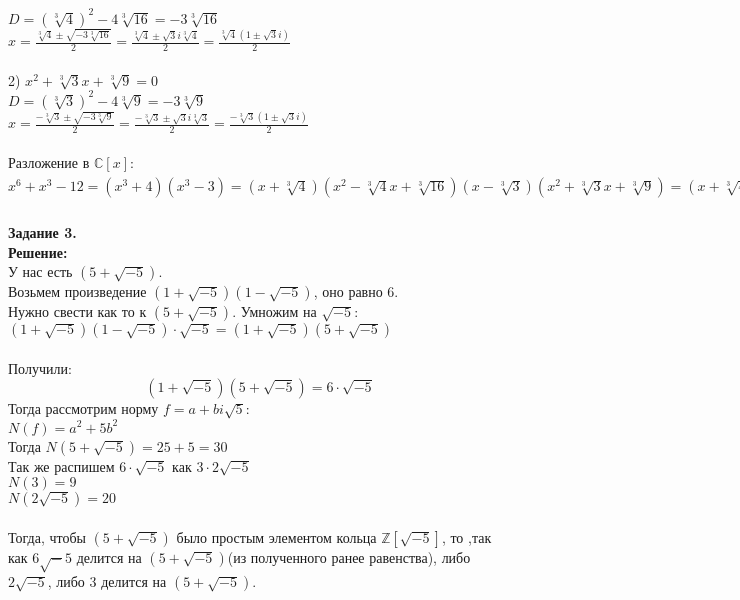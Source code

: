 \documentclass[12pt,a4paper]{scrartcl}
\begin{document}
	$D = (\sqrt[3]{4})^2 - 4\sqrt[3]{16} = -3\sqrt[3]{16}$\\
	$x = \frac{\sqrt[3]{4} \pm \sqrt{-3\sqrt[3]{16}}}{2} = \frac{\sqrt[3]{4} \pm \sqrt{3}i\sqrt[3]{4}}{2} = \frac{\sqrt[3]{4}(1 \pm \sqrt{3}i)}{2}$\\
	\\
	2) $x^2 + \sqrt[3]{3}x + \sqrt[3]{9} = 0$\\
	$D = (\sqrt[3]{3})^2 - 4\sqrt[3]{9} = -3\sqrt[3]{9}$\\
	$x = \frac{-\sqrt[3]{3} \pm \sqrt{-3\sqrt[3]{9}}}{2} = \frac{-\sqrt[3]{3} \pm \sqrt{3}i\sqrt[3]{3}}{2} = \frac{-\sqrt[3]{3}(1 \pm \sqrt{3}i)}{2}$\\
	\\
	Разложение в $\mathbb{C}[x]:$\\
	$x^6 + x^3 - 12 = (x^3 + 4)(x^3 - 3) = (x + \sqrt[3]{4})(x^2 - \sqrt[3]{4}x + \sqrt[3]{16})(x - \sqrt[3]{3})(x^2 + \sqrt[3]{3}x + \sqrt[3]{9}) = (x + \sqrt[3]{4})(x - \frac{\sqrt[3]{4}(1 + \sqrt{3}i)}{2})(x - \frac{\sqrt[3]{4}(1 - \sqrt{3}i)}{2})(x - \sqrt[3]{3})(x - \frac{-\sqrt[3]{3}(1 + \sqrt{-3}i)}{2})(x - \frac{-\sqrt[3]{3}(1 - \sqrt{3}i)}{2})$\\
	\\
	\textbf{Задание 3.} 
	\\
	\textbf{Решение:} \\
	У нас есть $(5 + \sqrt{-5})$.\\
	Возьмем произведение $(1 + \sqrt{-5})(1 - \sqrt{-5})$, оно равно 6.\\
	Нужно свести как то к $(5 + \sqrt{-5})$. Умножим на $\sqrt{-5}$:
	$(1 + \sqrt{-5})(1 - \sqrt{-5}) \cdot \sqrt{-5} = (1 + \sqrt{-5})(5 + \sqrt{-5})$\\
	\\
	Получили:
	$$(1 + \sqrt{-5})(5 + \sqrt{-5}) = 6 \cdot \sqrt{-5}$$
	Тогда рассмотрим норму $f = a + bi\sqrt{5}$:\\
	$N(f) = a^2 + 5b^2$\\
	Тогда $N(5 + \sqrt{-5}) = 25 + 5 = 30$\\
	Так же распишем $6 \cdot \sqrt{-5}$ как $3 \cdot 2\sqrt{-5}$\\
	$N(3) = 9$\\
	$N(2\sqrt{-5}) = 20$\\
	\\
	Тогда, чтобы $(5 + \sqrt{-5})$ было простым элементом кольца $\mathbb{Z}[\sqrt{-5}]$, то ,так как $6\sqrt
	-5$ делится на $(5 + \sqrt{-5})$(из полученного ранее равенства), либо $2\sqrt{-5}$, либо $3$ делится на $(5 + \sqrt{-5})$.\\
\end{document}
